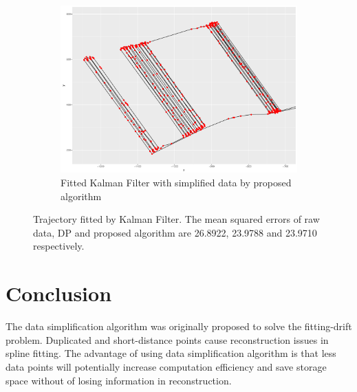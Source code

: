 \begin{figure}
\begin{subfigure}[t]{0.47\textwidth}
\includegraphics[width=\linewidth]{Chapters/06Spinoff/plot/ggSPKF2.pdf}
\caption{Fitted Kalman Filter with simplified data by proposed algorithm}
\end{subfigure}
\caption{Trajectory fitted by Kalman Filter. The mean squared errors of raw data, DP and proposed algorithm are 26.8922, 23.9788 and 23.9710 respectively.}\label{DataSimpKFTra}
\end{figure}

\pagebreak

\section{Conclusion}

The data simplification algorithm was originally proposed to solve the fitting-drift problem. Duplicated and short-distance points cause reconstruction issues in spline fitting. The advantage of using data simplification algorithm is that less data points will potentially increase computation efficiency and save storage space without of losing information in reconstruction.  
